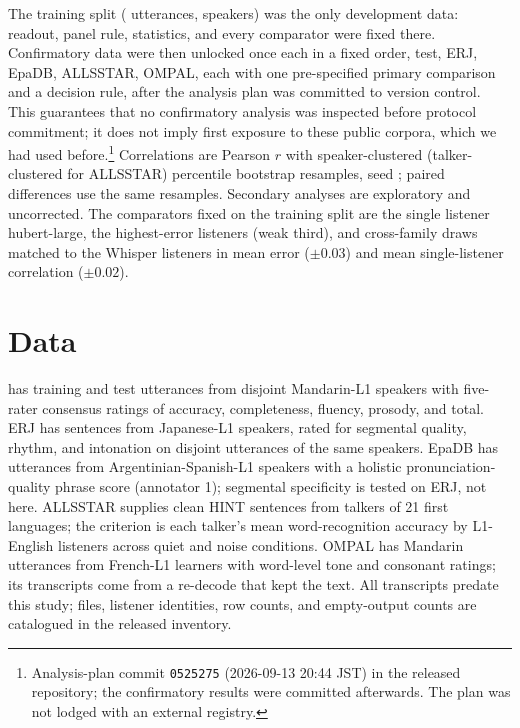The \so{} training split ( utterances,  speakers)
was the only development data: readout, panel rule, statistics, and every
comparator were fixed there. Confirmatory data were then unlocked once each in a fixed order, \so{}
test, ERJ, EpaDB, ALLSSTAR, OMPAL, each with one pre-specified primary
comparison and a decision rule, after the analysis plan was committed to
version control. This guarantees that no confirmatory analysis was inspected before
protocol commitment; it does not imply first exposure to these public
corpora, which we had used before.\footnote{\small Analysis-plan commit \texttt{0525275} (2026-09-13
20:44 JST) in the released repository; the confirmatory results were
committed afterwards. The plan was not lodged with an external registry.} Correlations are Pearson
$r$ with  speaker-clustered (talker-clustered for ALLSSTAR)
percentile bootstrap resamples, seed ; paired differences use the
same resamples. Secondary analyses are exploratory and uncorrected.
The comparators fixed on the training split are the single listener
\textsf{hubert-large}, the  highest-error listeners (weak third),
and  cross-family draws matched to the  Whisper
listeners in mean error ($\pm0.03$) and mean single-listener correlation
($\pm0.02$).

\section{Data}
\label{sec:data}
\so{} \cite{zhang2021speechocean} has  training and 
test utterances from disjoint Mandarin-L1 speakers with five-rater consensus
ratings of accuracy, completeness, fluency, prosody, and total.
ERJ \cite{minematsu2004} has  sentences from  Japanese-L1
speakers, rated for segmental quality, rhythm, and intonation on disjoint
utterances of the same speakers. EpaDB \cite{vidal2019} has 
utterances from  Argentinian-Spanish-L1 speakers with a
holistic pronunciation-quality phrase score (annotator 1); segmental
specificity is tested on ERJ, not here. ALLSSTAR \cite{bradlow2010allsstar,kim2025intelligibility}
supplies  clean HINT sentences from  talkers of 21
first languages; the criterion is each talker's mean word-recognition
accuracy by L1-English listeners across quiet and noise conditions. OMPAL
\cite{hsieh2025ompal} has  Mandarin utterances from 
French-L1 learners with word-level tone and consonant ratings; its
transcripts come from a re-decode that kept the text.
All transcripts predate this study; files, listener identities, row
counts, and empty-output counts are catalogued in the released inventory.

